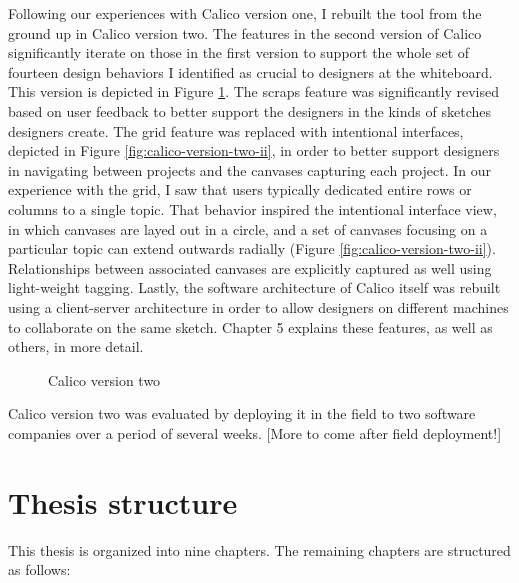 Following our experiences with Calico version one, I rebuilt the tool from the ground up in Calico version two. The features in the second version of Calico significantly iterate on those in the first version to support the whole set of fourteen design behaviors I identified as crucial to designers at the whiteboard. This version is depicted in Figure \ref{fig:calico-version-two}. The scraps feature was significantly revised based on user feedback to better support the designers in the kinds of sketches designers create. The grid feature was replaced with intentional interfaces, depicted in Figure \ref{fig:calico-version-two-ii}, in order to better support designers in navigating between projects and the canvases capturing each project. In our experience with the grid, I saw that users typically dedicated entire rows or columns to a single topic. That behavior inspired the intentional interface view, in which canvases are layed out in a circle, and a set of canvases focusing on a particular topic can extend outwards radially (Figure \ref{fig:calico-version-two-ii}). Relationships between associated canvases are explicitly captured as well using light-weight tagging. Lastly, the software architecture of Calico itself was rebuilt using a client-server architecture in order to allow designers on different machines to collaborate on the same sketch. Chapter 5 explains these features, as well as others, in more detail.

\begin{figure}
  \centering
   \caption {Calico version two}
   \label{fig:calico-version-two}
\end{figure}

Calico version two was evaluated by deploying it in the field to two software companies over a period of several weeks. [More to come after field deployment!]

\section{Thesis structure}

This thesis is organized into nine chapters. The remaining chapters are structured as follows:

